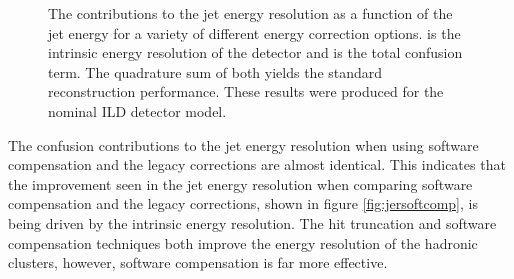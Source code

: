\begin{figure}[h!]
\caption[The contributions to the jet energy resolution as a function of the jet energy for a variety of different energy correction options.  \protect{} is the intrinsic energy resolution of the detector and \protect{} is the total confusion term.  The quadrature sum of both yields the standard reconstruction performance.  These results were produced for the nominal ILD detector model.]{The contributions to the jet energy resolution as a function of the jet energy for a variety of different energy correction options.  \protect{} is the intrinsic energy resolution of the detector and \protect{} is the total confusion term.  The quadrature sum of both yields the standard reconstruction performance.  These results were produced for the nominal ILD detector model.}
\label{fig:jerbreakdownsoftcomp}
\end{figure}

The confusion contributions to the jet energy resolution when using software compensation and the legacy corrections are almost identical.  This indicates that the improvement seen in the jet energy resolution when comparing software compensation and the legacy corrections, shown in figure \ref{fig:jersoftcomp}, is being driven by the intrinsic energy resolution.  The hit truncation and software compensation techniques both improve the energy resolution of the hadronic clusters, however, software compensation is far more effective.  

